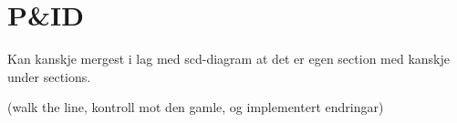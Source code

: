 \section{P\&ID}
\thispagestyle{fancy}

Kan kanskje mergest i lag med scd-diagram at det er egen section med kanskje under sections.

(walk the line, kontroll mot den gamle, og implementert endringar)